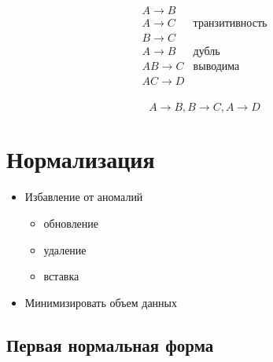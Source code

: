 \documentclass[a4paper, 14pt]{report}
\begin{document}
$$
\begin{matrix}
    A  \to B   &                        \\
    A  \to C   &  \text{транзитивность} \\
    B  \to C   &                        \\
    A  \to B   &  \text{дубль}          \\
    AB \to C   &  \text{выводима}        \\
    AC \to D   &                         \\
\end{matrix}
$$

$$
A \to B, B \to C, A \to D
$$

\section{Нормализация}

\begin{itemize}
    \item Избавление от аномалий

        \begin{itemize}
            \item обновление
            \item удаление
            \item вставка
        \end{itemize}

    \item Минимизировать объем данных
\end{itemize}

\subsection{Первая нормальная форма}
\end{document}
